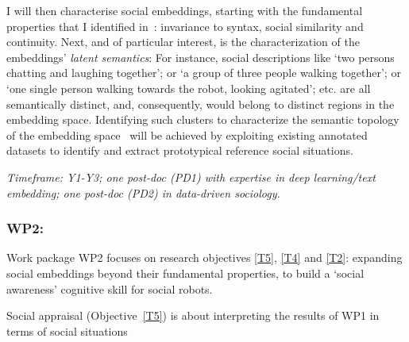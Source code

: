 I will then characterise social embeddings, starting with the fundamental
properties that I identified in~\cite{lemaignan2024social}: invariance to
syntax, social similarity and continuity. Next, and of particular interest, is
the characterization of the embeddings' \emph{latent semantics}: For instance,
social descriptions like `two persons chatting and laughing
together'; or `a group of three people walking together'; or `one single person
walking towards the robot, looking agitated'; etc.  are all semantically
distinct, and, consequently, would belong to distinct regions in the embedding
space. Identifying such clusters to characterize the semantic topology of the
embedding space~\cite{sun2023topological} will be achieved by exploiting
existing annotated datasets to identify and extract prototypical reference social situations.

\vspace{1em}
\noindent\emph{ Timeframe: Y1-Y3; one post-doc (PD1) with expertise in
    deep learning/text embedding; one post-doc (PD2) in data-driven sociology.}


\subsubsection{WP2: \textbf{\wpTwo}}

Work package WP2 focuses on research objectives \ref{T5}, \ref{T4} and \ref{T2}: expanding
social embeddings beyond their fundamental properties, to build a `social
awareness' cognitive skill for social robots.





Social appraisal (Objective~\ref{T5}) is about interpreting the results of WP1
in terms of social situations

